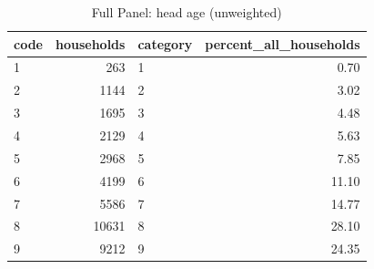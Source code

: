 \begin{table}
\caption{Full Panel: head age (unweighted)}
\begin{tabular}{lrlr}
\toprule
code & households & category & percent\_all\_households \\
\midrule
1 & 263 & 1 & 0.70 \\
2 & 1144 & 2 & 3.02 \\
3 & 1695 & 3 & 4.48 \\
4 & 2129 & 4 & 5.63 \\
5 & 2968 & 5 & 7.85 \\
6 & 4199 & 6 & 11.10 \\
7 & 5586 & 7 & 14.77 \\
8 & 10631 & 8 & 28.10 \\
9 & 9212 & 9 & 24.35 \\
\bottomrule
\end{tabular}
\end{table}
